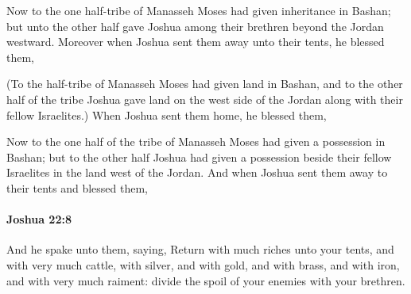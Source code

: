 			\begin{versebox}
					\item[BHS] 
					\item[ASV] Now to the one half-tribe of Manasseh Moses had given inheritance in Bashan; but unto the other half gave Joshua among their brethren beyond the Jordan westward. Moreover when Joshua sent them away unto their tents, he blessed them,
					\item[NIV] (To the half-tribe of Manasseh Moses had given land in Bashan, and to the other half of the tribe Joshua gave land on the west side of the Jordan along with their fellow Israelites.) When Joshua sent them home, he blessed them,
					\item[NRSV] Now to the one half of the tribe of Manasseh Moses had given a possession in Bashan; but to the other half Joshua had given a possession beside their fellow Israelites in the land west of the Jordan. And when Joshua sent them away to their tents and blessed them,
			\end{versebox}

		\paragraph{Joshua 22:8} %
			\label{JOSHUA-22-8}

			And he spake unto them, saying, Return with much riches unto your tents, and with very much cattle, with silver, and with gold, and with brass, and with iron, and with very much raiment: divide the spoil of your enemies with your brethren.

